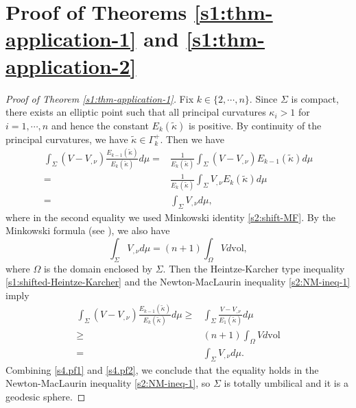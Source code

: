\documentclass[11pt,reqno]{amsart}
\theoremstyle{definition}
\theoremstyle{remark}
\newtheorem{rem}[thm]{Remark}
\numberwithin{equation}{section}
\renewcommand{\(}{\left(}
\renewcommand{\)}{\right)}
\renewcommand{\~}{\widetilde}
\renewcommand{\-}{\overline}
\renewcommand{\k}{\kappa}
\newcommand{\G}{\Gamma}
\begin{document}
\section{Proof of Theorems \ref{s1:thm-application-1} and \ref{s1:thm-application-2}}\label{sec:4}
\begin{proof}[Proof of Theorem \ref{s1:thm-application-1}]
	Fix $k\in \{2,\cdots,n\}$. Since $\Sigma$ is compact, there exists an elliptic point such that all principal curvatures $\k_i>1$ for $i=1,\cdots,n$ and hence the constant $E_k(\~{\k})$ is positive. By continuity of the principal curvatures, we have $\~{\k}\in \G_k^{+}$. Then we have
	\begin{align}\label{s4.pf1}
	\int_{\Sigma} (V-V_{,\nu}) \frac{E_{k-1}(\~{\k})}{E_k(\~{\k})}d\mu=&\frac{1}{E_k(\~{\k})}\int_{\Sigma} (V-V_{,\nu}) E_{k-1}(\~{\k})d\mu\nonumber\\
=&\frac{1}{E_k(\~{\k})}\int_{\Sigma} V_{,\nu} E_k(\~{\k})d\mu\nonumber\\
	=&\int_{\Sigma} V_{,\nu} d\mu,
	\end{align}
	where in the second equality we used Minkowski identity \eqref{s2:shift-MF}.
	By the Minkowski formula (see \cite{Montiel-Ros1991}), we also have
\begin{equation}\label{s4.Mink}
\int_{\Sigma}V_{,\nu}d\mu=(n+1)\int_\Omega V d\mathrm{vol},
\end{equation}
where $\Omega$ is the domain enclosed by $\Sigma$. Then the Heintze-Karcher type inequality \eqref{s1:shifted-Heintze-Karcher} and the Newton-MacLaurin inequality \eqref{s2:NM-ineq-1} imply
	\begin{align}\label{s4.pf2}
	\int_{\Sigma} (V-V_{,\nu}) \frac{E_{k-1}(\~{\k})}{E_k(\~{\k})}d\mu\geq& \int_{\Sigma} \frac{V-V_{,\nu}}{E_1(\~{\k})}d\mu\nonumber\\
\geq & (n+1)\int_\Omega V d\mathrm{vol}\nonumber\\
=&\int_{\Sigma}V_{,\nu}d\mu.
	\end{align}
	Combining \eqref{s4.pf1} and \eqref{s4.pf2}, we conclude that the equality holds in the Newton-MacLaurin inequality \eqref{s2:NM-ineq-1}, so $\Sigma$ is totally umbilical and it is a geodesic sphere.
\end{proof}
\end{document}
